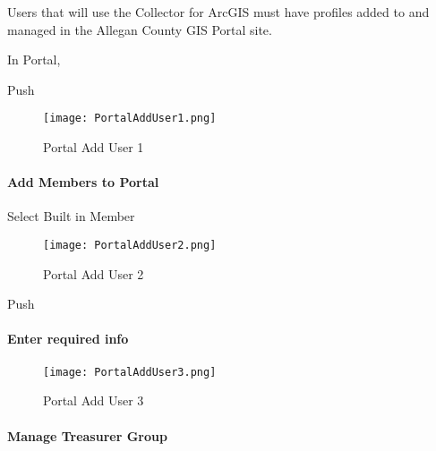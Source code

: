  \noindent Users that will use the Collector for ArcGIS must have profiles added to and managed in the Allegan County GIS Portal site.
 \vspace{.5in}

 In Portal, {\rtArrow} 

\vspace{.2in}

{\btn Push }

 \begin{figure}[h!]
 \centering
     \texttt{[image: PortalAddUser1.png]}
 \caption{Portal Add User 1}
 \end{figure}
 \clearpage
 \paragraph[Add Members to Portal]{\Large Add Members to Portal\texorpdfstring{\\}{}}
 \vspace{.4in}

 {\Large Select Built in Member {\rtArrow}}
 \vspace{.4in}

 \begin{figure}[h!]
 \centering
     \texttt{[image: PortalAddUser2.png]}
 \caption{Portal Add User 2}
 \end{figure}

{\bigbtn Push }

 \clearpage
 \paragraph[Enter required info]{\Large Enter required info\texorpdfstring{\\}{}}
 \vspace{.5in}

 \begin{figure}[h!]
 \centering
     \texttt{[image: PortalAddUser3.png]}
 \caption{Portal Add User 3}
 \end{figure}
 \clearpage
 \paragraph[Manage Treasurer Group]{\Large Manage Treasurer Group\texorpdfstring{\\}{}}
 \vspace{.5in}

